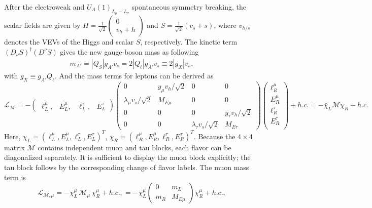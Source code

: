 \documentclass[onecolumn, aps, nofootinbib, prd, preprint, floats, floatfix, amsmath, amssymb, superscriptaddress, preprintnumbers]{revtex4-2}
\begin{document}
After the electroweak and $U_A(1)_{L_\mu-L_\tau}$ spontaneous symmetry breaking, the scalar fields are given by $H=\frac{1}{\sqrt{2}}\left (\begin{array}{c} 0 \\ v_h+h \end{array}\right)$ and $S=\frac{1}{\sqrt{2}} (v_s + s)$, where $v_{h/s}$ denotes the VEVs of the Higgs and scalar $S$, respectively. The kinetic term
$(D_\nu S)^\dagger(D^\nu S)$ gives the new gauge-boson mass as following
\begin{align}
m_{A'}=|Q_S|g_{A'}v_s=2|Q_\ell|g_{A'}v_s\equiv2|g_X|v_s,
\end{align} 
with $g_X\equiv g_{A'}Q_\ell$. And the mass terms for leptons can be derived as
\begin{equation}
\mathcal{L}_{\mathcal M}=-
\begin{pmatrix}
	\overline{\ell^{\mu}_L},  &
	\overline{E^\mu_L}, &
	\overline{\ell^\tau_L}, &
	\overline{E^\tau_L}
\end{pmatrix}
\begin{pmatrix}
	0 & y_{\mu}v_h/\sqrt2  & 0 & 0 \\
	\lambda_\mu v_s/\sqrt2 & M_{E\mu} & 0 & 0\\
	0 & 0 & 0 & y_{\tau}v_h/\sqrt2\\
    0 & 0 &  \lambda_\tau v_s/\sqrt2 & M_{E\tau}
\end{pmatrix}
\begin{pmatrix}
	\ell^{\mu}_R \\
	E^\mu_R \\
	  \ell^\tau_R \\
	  E^\tau_R \\
\end{pmatrix}
+h.c. = -\bar{\chi}_L \mathcal{M} \chi_R + h.c.
\label{eq:4by4-mass-no-mutau}
\end{equation}
Here, $\chi_L=(\ell^{\mu}_L,E^\mu_L,\ell^\tau_L, E^\tau_L)^T$, $\chi_R=(\ell^{\mu}_R,E^\mu_R,\ell^\tau_R, E^\tau_R)^T$. Because the
$4\times4$ matrix $\mathcal M$ contains independent muon and tau blocks, each
flavor can be diagonalized separately.  It is sufficient to display the muon
block explicitly; the tau block follows by the corresponding change of flavor
labels.  The muon mass term is
\begin{equation}
\mathcal{L}_{\mathcal{M},\mu}
=-\overline{\chi^\mu_L}\,\mathcal{M}_\mu\,\chi^\mu_R+h.c.,
=-\overline{\chi^\mu_L}
\begin{pmatrix}
0 & m_L\\
m_R & M_{E\mu}
\end{pmatrix} \chi^\mu_R+h.c.,
\label{eq:mu-2by2-mass}
\end{equation}
\end{document}
